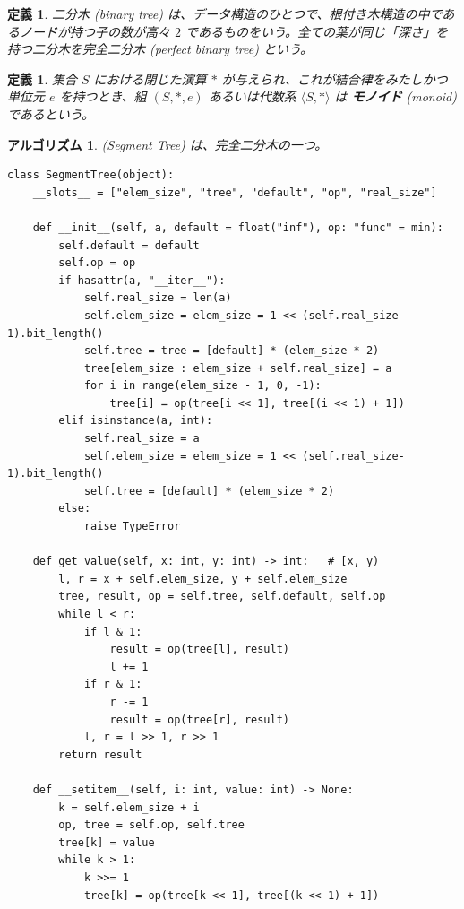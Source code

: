 \documentclass[12pt, a4j]{ltjsarticle}
\newtheorem{defi}[thm]{定義}
\newtheorem{alg}[thm]{アルゴリズム}
\newcommand*{\SS}{\vspace{1cm}}
\begin{document}
\SS

\begin{defi} 二分木 (binary tree) は、データ構造のひとつで、根付き木構造の中であるノードが持つ子の数が高々 $2$ であるものをいう。全ての葉が同じ「深さ」を持つ二分木を完全二分木 (perfect binary tree) という。
\end{defi}

\SS

\begin{defi} 集合 $S$ における閉じた演算 $*$ が与えられ、これが結合律をみたしかつ単位元 $e$ を持つとき、組 $(S,*,e)$ あるいは代数系 $\langle S, * \rangle$ は {\bf モノイド} (monoid) であるという。
\end{defi}

\newpage

\begin{alg}  (Segment Tree) は、完全二分木の一つ。\\
\begin{lstlisting}
class SegmentTree(object):
    __slots__ = ["elem_size", "tree", "default", "op", "real_size"]

    def __init__(self, a, default = float("inf"), op: "func" = min):
        self.default = default
        self.op = op
        if hasattr(a, "__iter__"):
            self.real_size = len(a)
            self.elem_size = elem_size = 1 << (self.real_size-1).bit_length()
            self.tree = tree = [default] * (elem_size * 2)
            tree[elem_size : elem_size + self.real_size] = a
            for i in range(elem_size - 1, 0, -1):
                tree[i] = op(tree[i << 1], tree[(i << 1) + 1])
        elif isinstance(a, int):
            self.real_size = a
            self.elem_size = elem_size = 1 << (self.real_size-1).bit_length()
            self.tree = [default] * (elem_size * 2)
        else:
            raise TypeError

    def get_value(self, x: int, y: int) -> int:   # [x, y)
        l, r = x + self.elem_size, y + self.elem_size
        tree, result, op = self.tree, self.default, self.op
        while l < r:
            if l & 1:
                result = op(tree[l], result)
                l += 1
            if r & 1:
                r -= 1
                result = op(tree[r], result)
            l, r = l >> 1, r >> 1
        return result

    def __setitem__(self, i: int, value: int) -> None:
        k = self.elem_size + i
        op, tree = self.op, self.tree
        tree[k] = value
        while k > 1:
            k >>= 1
            tree[k] = op(tree[k << 1], tree[(k << 1) + 1])


\end{lstlisting}
\end{alg}
\end{document}
